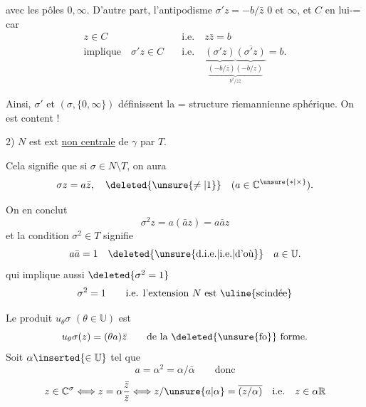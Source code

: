 
avec les pôles $0,\infty$. D'autre part, l'antipodisme $\sigma'z=-b/\bar z$  $0$ et $\infty$, et  $C$ en lui-= car
\[
\begin{aligned}
z\in C&\quad\text{i.e.}\quad z\bar z=b\\
\text{implique}\quad \sigma'z\in C&\quad\text{i.e.}\quad
\underset{\underbrace{(-b/\bar z)(-b/z)}_{b^2/z\bar z}}{\underbrace{(\sigma'z)}\underbrace{\overline{(\sigma'z)}}}=b.
\end{aligned}
\]

Ainsi, $\sigma'$ et $(\sigma,\{0,\infty\})$ définissent la = structure riemannienne sphérique. On est content !

2) $N$ est ext \uline{non centrale} de $\gamma$ par $T$.

Cela signifie que si $\sigma\in N\setminus T$, on aura
\[
\sigma z=a\bar z,\quad\deleted{\unsure{\ne|1}}\quad(a\in\mathbb C^{\unsure{*|\times}}).
\]

On en conclut
\[
\sigma^2z=a(\bar a z)=a\bar a z
\]
et la condition $\sigma^2\in T$ signifie
\[
a\bar a=1\quad\text{\deleted{\unsure{d.i.e.|i.e.|d'où}}}\quad a\in\mathbb U.
\]
qui implique aussi $\deleted{\sigma^2=1}$
\[
\sigma^2=1\qquad\text{i.e. l'extension $N$ est \uline{scindée}}
\]

Le produit $u_\theta\sigma$ $(\theta\in\mathbb U)$ est
\[
u_\theta\sigma(z)=(\theta a)\bar z\qquad\text{de la \deleted{\unsure{fo}} forme.}
\]
Soit $\alpha\inserted{\in\mathbb U}$ tel que
\[
a=\alpha^2=\alpha/\bar\alpha\qquad\text{donc}
\]
\[
z\in\mathbb C^\sigma\Longleftrightarrow z=\alpha\frac{\bar z}{\bar z}\Longleftrightarrow z/\unsure{a|\alpha}=\overline{(z/\alpha)}\quad\text{i.e.}\quad z\in\alpha\mathbb R
\]
